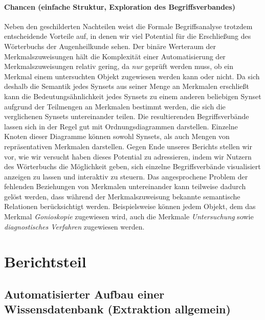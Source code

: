 \documentclass[pagesize,DIV=calc,12pt,draft]{scrreprt}
\begin{document}
\subsubsection{Chancen (einfache Struktur, Exploration des Begriffsverbandes)}

Neben den geschilderten Nachteilen weist die Formale Begriffsanalyse trotzdem entscheidende Vorteile auf, in denen wir viel Potential für die Erschließung des Wörterbuchs der Augenheilkunde sehen. 
Der binäre Werteraum der Merkmalszuweisungen hält die Komplexität einer Automatisierung der Merkmalszuweisungen relativ gering, da \emph{nur} geprüft werden muss, ob ein Merkmal einem untersuchten Objekt zugewiesen werden kann oder nicht. 
Da sich deshalb die Semantik jedes Synsets aus seiner Menge an Merkmalen erschließt kann die Bedeutungsähnlichkeit jedes Synsets zu einem anderen beliebigen Synset aufgrund der Teilmengen an Merkmalen bestimmt werden, die sich die verglichenen Synsets untereinander teilen. 
Die resultierenden Begriffsverbände lassen sich in der Regel gut mit Ordnungsdiagrammen darstellen.
Einzelne Knoten dieser Diagramme können sowohl Synsets, als auch Mengen von repräsentativen Merkmalen darstellen. 
Gegen Ende unseres Berichts stellen wir vor, wie wir versucht haben dieses Potential zu adressieren, indem wir Nutzern des Wörterbuchs die Möglichkeit geben, sich einzelne Begriffsverbände visualisiert anzeigen zu lassen und interaktiv zu steuern. 
Das angesprochene Problem der fehlenden Beziehungen von Merkmalen untereinander kann teilweise dadurch gelöst werden, dass während der Merkmalszuweisung bekannte semantische Relationen berücksichtigt werden. 
Beispielsweise können jedem Objekt, dem das Merkmal \emph{Gonioskopie} zugewiesen wird, auch die Merkmale \emph{Untersuchung} sowie \emph{diagnostisches Verfahren} zugewiesen werden. 

\chapter{Berichtsteil}

\section{Automatisierter Aufbau einer Wissensdatenbank (Extraktion allgemein)}
\end{document}
